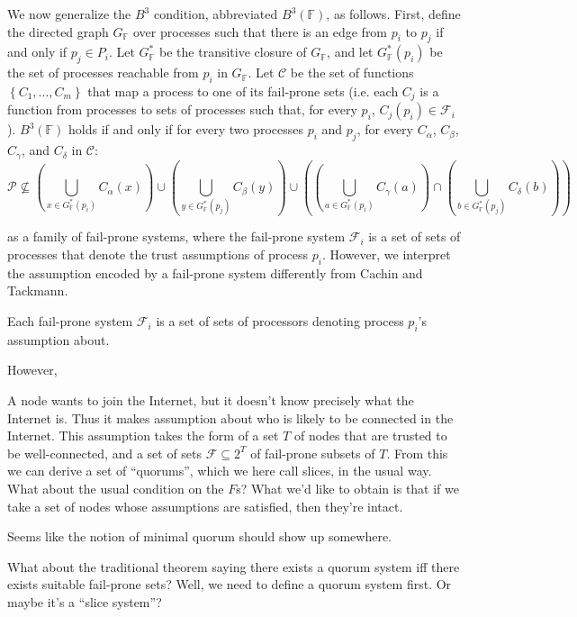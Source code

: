 \documentclass[11pt]{article}
\begin{document}
  We now generalize the $B^3$ condition, abbreviated $B^3(\mathbb{F})$, as follows. First, define the directed graph $G_\mathbb{F}$ over processes such that there is an edge from $p_i$ to $p_j$ if and only if $p_j\in P_i$. Let $G_\mathbb{F}^*$ be the transitive closure of $G_\mathbb{F}$, and let $G_\mathbb{F}^*(p_i)$ be the set of processes reachable from $p_i$ in $G_\mathbb{F}$. Let $\mathcal{C}$ be the set of functions $\left\{C_1,...,C_m\right\}$ that map a process to one of its fail-prone sets (i.e. each $C_j$ is a function from processes to sets of processes such that, for every $p_i$, $C_j(p_i)\in \mathcal{F}_i$).
  $B^3(\mathbb{F})$ holds if and only if for every two processes $p_i$ and $p_j$, for every $C_\alpha$, $C_\beta$, $C_\gamma$, and $C_\delta$ in $\mathcal{C}$:
  \begin{equation}
    \mathcal{P}\not\subseteq \left(\bigcup_{x \in G_\mathbb{F}^*(p_i)}C_\alpha(x)\right) \cup \left(\bigcup_{y \in G_\mathbb{F}^*(p_j)}C_\beta(y)\right) \cup \left(\left(\bigcup_{a \in G_\mathbb{F}^*(p_i)}C_\gamma(a)\right) \cap \left(\bigcup_{b \in G_\mathbb{F}^*(p_j)}C_\delta(b)\right) \right)
  \end{equation}

  as a family of
fail-prone systems, where the fail-prone system $\mathcal{F}_i$ is a set of
sets of processes that denote the trust assumptions of process $p_i$. However,
we interpret the assumption encoded by a fail-prone system differently from
Cachin and Tackmann.


Each fail-prone system $\mathcal{F}_i$ is a set of sets of
processors denoting process $p_i$'s assumption about.

However,

A node wants to join the Internet, but it doesn't know precisely what the
Internet is. Thus it makes assumption about who is likely to be connected in
the Internet. This assumption takes the form of a set $T$ of nodes that are
trusted to be well-connected, and a set of sets $\mathcal{F}\subseteq 2^{T}$ of
fail-prone subsets of $T$. From this we can derive a set of ``quorums'', which
we here call slices, in the usual way. What about the usual condition on the
$F$s? What we'd like to obtain is that if we take a set of nodes whose
assumptions are satisfied, then they're intact.

Seems like the notion of minimal quorum should show up somewhere.

What about the traditional theorem saying there exists a quorum system iff
there exists suitable fail-prone sets? Well, we need to define a quorum system
first. Or maybe it's a ``slice system''?
\end{document}

